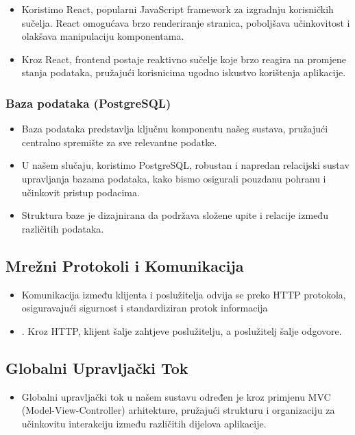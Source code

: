\begin{itemize}
    \item Koristimo React, popularni JavaScript framework za izgradnju korisničkih sučelja. React omogućava brzo renderiranje stranica, poboljšava učinkovitost i olakšava manipulaciju komponentama.
    \item Kroz React, frontend postaje reaktivno sučelje koje brzo reagira na promjene stanja podataka, pružajući korisnicima ugodno iskustvo korištenja aplikacije.
\end{itemize}

 

\subsubsection*{Baza podataka (PostgreSQL)}
\begin{itemize}
    \item Baza podataka predstavlja ključnu komponentu našeg sustava, pružajući centralno spremište za sve relevantne podatke. 
    \item U našem slučaju, koristimo PostgreSQL, robustan i napredan relacijski sustav upravljanja bazama podataka, kako bismo osigurali pouzdanu pohranu i učinkovit pristup podacima. 
    \item Struktura baze je dizajnirana da podržava složene upite i relacije između različitih podataka.
\end{itemize}

\subsection*{Mrežni Protokoli i Komunikacija}
\begin{itemize}
    \item Komunikacija između klijenta i poslužitelja odvija se preko HTTP protokola, osiguravajući sigurnost i standardiziran protok informacija
    \item .  Kroz HTTP, klijent šalje zahtjeve poslužitelju, a poslužitelj šalje odgovore. 
\end{itemize}

\subsection*{Globalni Upravljački Tok}
\begin{itemize}
    \item Globalni upravljački tok u našem sustavu određen je kroz primjenu MVC (Model-View-Controller) arhitekture, pružajući strukturu i organizaciju za učinkovitu interakciju između različitih dijelova aplikacije. 
\end{itemize}

